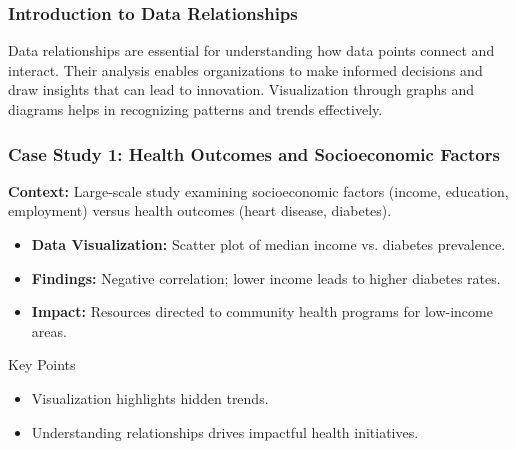 \documentclass[aspectratio=169]{beamer}
\begin{document}
\begin{frame}[fragile]
    \frametitle{Introduction to Data Relationships}
    Data relationships are essential for understanding how data points connect and interact. Their analysis enables organizations to make informed decisions and draw insights that can lead to innovation. 
    Visualization through graphs and diagrams helps in recognizing patterns and trends effectively.
\end{frame}

\begin{frame}[fragile]
    \frametitle{Case Study 1: Health Outcomes and Socioeconomic Factors}
    \textbf{Context:} Large-scale study examining socioeconomic factors (income, education, employment) versus health outcomes (heart disease, diabetes).
    
    \begin{itemize}
        \item \textbf{Data Visualization:} Scatter plot of median income vs. diabetes prevalence.
        \item \textbf{Findings:} Negative correlation; lower income leads to higher diabetes rates.
        \item \textbf{Impact:} Resources directed to community health programs for low-income areas.
    \end{itemize}

    \begin{block}{Key Points}
        \begin{itemize}
            \item Visualization highlights hidden trends.
            \item Understanding relationships drives impactful health initiatives.
        \end{itemize}
    \end{block}
\end{frame}
\end{document}
